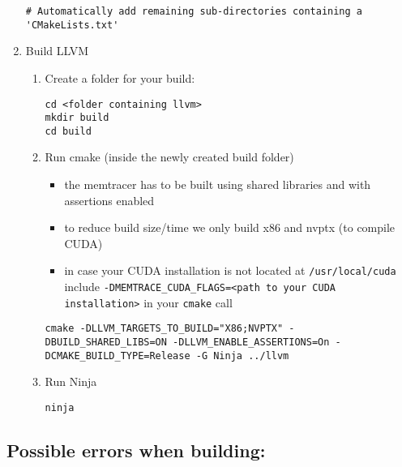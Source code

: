 \documentclass{scrartcl}
\begin{document}
\begin{enumerate}
\begin{lstlisting}[firstnumber=47]
# Automatically add remaining sub-directories containing a 'CMakeLists.txt'
\end{lstlisting}
	\item Build LLVM
	\begin{enumerate}
		\item Create a folder for your build:
\begin{lstlisting}[language=myLang]
cd <folder containing llvm>
mkdir build
cd build
\end{lstlisting}
		\item Run cmake (inside the newly created build folder)
		\begin{itemize}
			\item the memtracer has to be built using shared libraries and with assertions enabled
			\item to reduce build size/time we only build x86 and nvptx (to compile CUDA)
			\item in case your CUDA installation is not located at \lstinline{/usr/local/cuda} include \lstinline{-DMEMTRACE_CUDA_FLAGS=<path to your CUDA installation>} in your \lstinline{cmake} call
		\end{itemize}
\begin{lstlisting}[language=myLang]
cmake -DLLVM_TARGETS_TO_BUILD="X86;NVPTX" -DBUILD_SHARED_LIBS=ON -DLLVM_ENABLE_ASSERTIONS=On -DCMAKE_BUILD_TYPE=Release -G Ninja ../llvm
\end{lstlisting}
		\item Run Ninja
\begin{lstlisting}[language=myLang]
ninja
\end{lstlisting}
	\end{enumerate}
\end{enumerate}

\subsection{Possible errors when building:}
\end{document}

